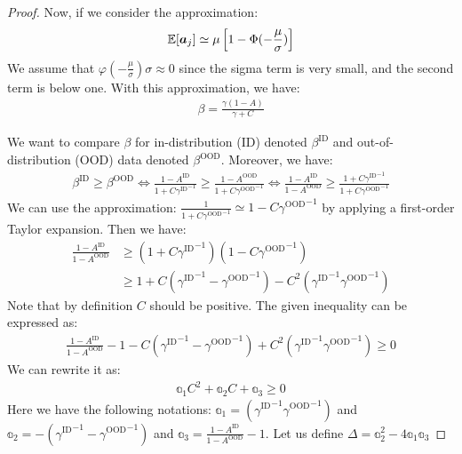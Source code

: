 \documentclass{article} %
\theoremstyle{plain}
\begin{document}
\begin{proof}
Now, if we consider the approximation:
\begin{align}
\mathbb{E}[ {\bm{a}}_j] \simeq  \mu \left[1- \Phi (-\frac{\mu}{\sigma}) \right] 
\end{align}
We assume that $\varphi\left(-\frac{\mu}{\sigma}\right)\sigma \approx 0$ since the sigma term is very small, and the second term is below one. With this approximation, we have:
\begin{align}
 \beta = \frac{  \gamma (1- A  )  }{ \gamma +C} 
\end{align}

We want to compare $\beta$ for in-distribution (ID) denoted $\beta^{\text{ID}}$ and out-of-distribution (OOD) data denoted $\beta^{\text{OOD}}$.
Moreover, we have:
\begin{align}
\beta^{\text{ID}} \geq \beta^{\text{OOD}}\iff
\frac{1- A^{\text{ID}}}{ 1 +C{\gamma^{\text{ID}}}^{-1}} \geq \frac{1- A^{\text{OOD}}}{ 1 +C{\gamma^{\text{OOD}}}^{-1}}
\iff
 \frac{1- A^{\text{ID}}}{1- A^{\text{OOD}}} \geq \frac{1 +C{\gamma^{\text{ID}}}^{-1}}{ 1 +C{\gamma^{\text{OOD}}}^{-1}}
 \end{align}
   We can use the approximation:
$\frac{1}{1 +C{\gamma^{\text{OOD}}}^{-1}} \simeq 1 -C{\gamma^{\text{OOD}}}^{-1}$ by applying a first-order Taylor expansion. Then we have:
\begin{align}
\frac{1- A^{\text{ID}}}{1- A^{\text{OOD}}} &\geq (1 +C{\gamma^{\text{ID}}}^{-1})( 1 -C{\gamma^{\text{OOD}}}^{-1})\\
&\geq 1 +C({\gamma^{\text{ID}}}^{-1} -{\gamma^{\text{OOD}}}^{-1}) - C^2({\gamma^{\text{ID}}}^{-1} {\gamma^{\text{OOD}}}^{-1})
\end{align}
    Note that by definition $C$ should be positive. 
   The given inequality can be expressed as:
   \begin{align}
   \frac{1- A^{\text{ID}}}{1- A^{\text{OOD}}}- 1 -C({\gamma^{\text{ID}}}^{-1} -{\gamma^{\text{OOD}}}^{-1}) + C^2({\gamma^{\text{ID}}}^{-1} {\gamma^{\text{OOD}}}^{-1})  \geq 0
   \end{align}
   We can rewrite it as:
   \begin{align}\mathbb{a}_1C^2 + \mathbb{a}_2C + \mathbb{a}_3  \geq 0
   \end{align}
   Here we have the following notations: $\mathbb{a}_1 =({\gamma^{\text{ID}}}^{-1} {\gamma^{\text{OOD}}}^{-1})$ and $\mathbb{a}_2 =-({\gamma^{\text{ID}}}^{-1} -{\gamma^{\text{OOD}}}^{-1}) $
   and $\mathbb{a}_3= \frac{1- A^{\text{ID}}}{1- A^{\text{OOD}}}- 1$.
   Let us define $\Delta = \mathbb{a}_2^2-4\mathbb{a}_1\mathbb{a}_3$  

\end{proof}
\end{document}
